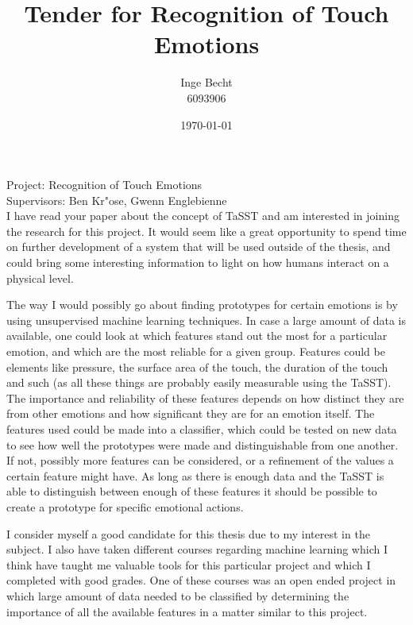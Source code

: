 \documentclass{article}
\title{Tender for Recognition of Touch Emotions}
\author{Inge Becht \\6093906}
\date{\today}
\begin{document}
\maketitle
Project: Recognition of Touch Emotions\\
Supervisors: Ben Kr"ose, Gwenn Englebienne\\

I have read your paper about the concept of TaSST and am interested in joining the research for this project. It would seem like a great opportunity to spend time on further development of a system that will be used outside of the thesis, and could bring some interesting information to light on how humans interact on a physical level.

The way I would possibly go about finding prototypes for certain emotions is by using unsupervised machine learning techniques. In case a large amount of data is available, one could look at which features stand out the most for a particular emotion, and which are the most reliable for a given group. Features could be elements like pressure, the surface area of the touch, the duration of the touch and such (as all these things are probably easily measurable using the TaSST). The importance and reliability of these features depends on how distinct they are from other emotions and how significant they are for an emotion itself. The features used could be made into a classifier, which could be tested on new data to see how well the prototypes were made and distinguishable from one another. If not, possibly more features can be considered, or a refinement of the values a certain feature might have.
As long as there is enough data and the TaSST is able to distinguish between enough of these features it should be possible to create a prototype for specific emotional actions. 

I consider myself a good candidate for this thesis due to my interest in the subject. I also  have taken different courses regarding machine learning which I think have taught me valuable tools for this particular project and which I completed with good grades. One of these courses was an open ended project in which large amount of data needed to be classified by determining the importance of all the available features in a matter similar to this project.
\end{document}
